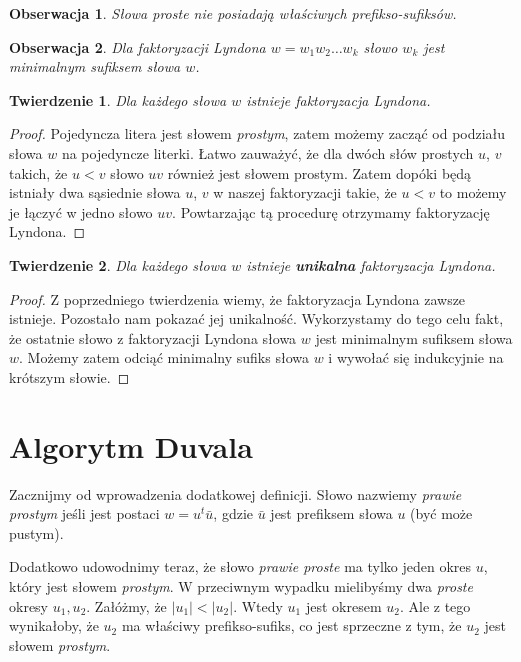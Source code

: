 \documentclass{article}
\newtheorem{theorem}{Twierdzenie}
\newtheorem{observation}{Obserwacja}
\begin{document}
\begin{observation}
    Słowa \textit{proste} nie posiadają właściwych prefikso-sufiksów.
\end{observation}

\begin{observation}
    Dla faktoryzacji Lyndona $w = w_1w_2\ldots w_k$ słowo $w_k$ jest minimalnym sufiksem słowa $w$. 
\end{observation}

\begin{theorem}
    Dla każdego słowa $w$ istnieje faktoryzacja Lyndona.
\end{theorem}

\begin{proof}
    Pojedyncza litera jest słowem \textit{prostym}, zatem możemy zacząć od podziału słowa $w$ na pojedyncze literki.
    Łatwo zauważyć, że dla dwóch słów prostych $u$, $v$ takich, że $u < v$ słowo $uv$ również jest słowem prostym.
    Zatem dopóki będą istniały dwa sąsiednie słowa $u$, $v$ w naszej faktoryzacji takie, że $u < v$ to możemy je łączyć w jedno słowo $uv$.
    Powtarzając tą procedurę otrzymamy faktoryzację Lyndona.
\end{proof}

\begin{theorem}
    Dla każdego słowa $w$ istnieje \textbf{unikalna} faktoryzacja Lyndona.
\end{theorem}

\begin{proof}
    Z poprzedniego twierdzenia wiemy, że faktoryzacja Lyndona zawsze istnieje. Pozostało nam pokazać jej unikalność.
    Wykorzystamy do tego celu fakt, że ostatnie słowo z faktoryzacji Lyndona słowa $w$ jest minimalnym sufiksem słowa $w$. 
    Możemy zatem odciąć minimalny sufiks słowa $w$ i wywołać się indukcyjnie na krótszym słowie.
\end{proof}

\section{Algorytm Duvala}

Zacznijmy od wprowadzenia dodatkowej definicji. Słowo nazwiemy \textit{prawie prostym} jeśli jest postaci $w = u^t\bar{u}$, gdzie 
$\bar{u}$ jest prefiksem słowa $u$ (być może pustym). 

Dodatkowo udowodnimy teraz, że słowo \textit{prawie proste}
ma tylko jeden okres $u$, który jest słowem \textit{prostym}. W przeciwnym wypadku mielibyśmy dwa \textit{proste} okresy $u_1, u_2$.
Załóżmy, że $|u_1| < |u_2|$. Wtedy $u_1$ jest okresem $u_2$. Ale z tego wynikałoby, że $u_2$ ma właściwy prefikso-sufiks, 
co jest sprzeczne z tym, że $u_2$ jest słowem \textit{prostym}. 
\end{document}
